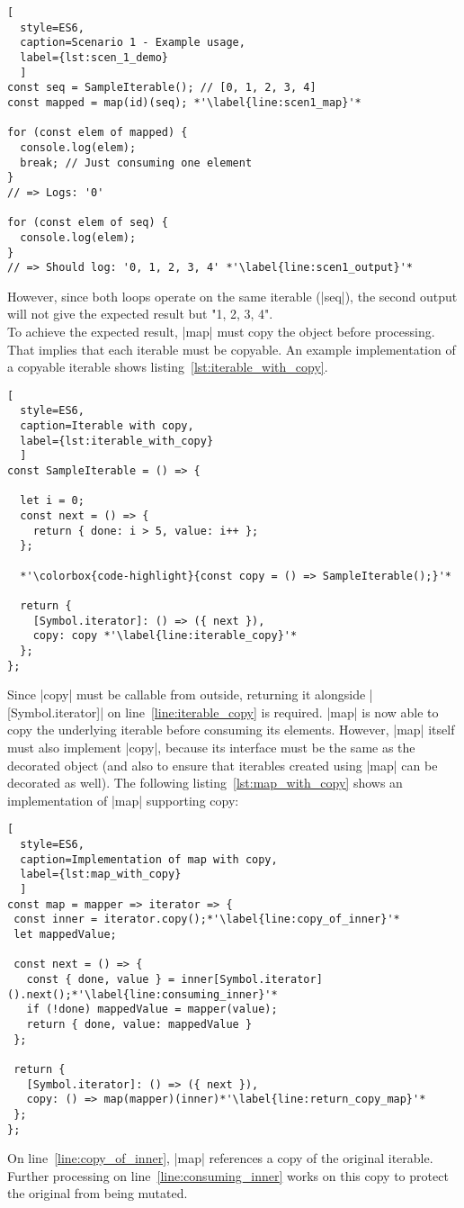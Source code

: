 \begin{lstlisting}[
  style=ES6, 
  caption=Scenario 1 - Example usage,
  label={lst:scen_1_demo}
  ]
const seq = SampleIterable(); // [0, 1, 2, 3, 4]
const mapped = map(id)(seq); *'\label{line:scen1_map}'*

for (const elem of mapped) {
  console.log(elem);
  break; // Just consuming one element
}
// => Logs: '0'

for (const elem of seq) {
  console.log(elem);
}
// => Should log: '0, 1, 2, 3, 4' *'\label{line:scen1_output}'*
\end{lstlisting}
However, since both loops operate on the same iterable (|seq|), the second output
will not give the expected result but "1, 2, 3, 4".\\
To achieve the expected result, |map| must copy the object before processing.
That implies that each iterable must be copyable. An example implementation
of a copyable iterable shows listing~\ref{lst:iterable_with_copy}.

\begin{lstlisting}[
  style=ES6, 
  caption=Iterable with copy,
  label={lst:iterable_with_copy}
  ]
const SampleIterable = () => {

  let i = 0;
  const next = () => {
    return { done: i > 5, value: i++ };
  };

  *'\colorbox{code-highlight}{const copy = () => SampleIterable();}'*

  return {
    [Symbol.iterator]: () => ({ next }),
    copy: copy *'\label{line:iterable_copy}'*
  };
};
\end{lstlisting}
Since |copy| must be callable from outside, returning it alongside 
|[Symbol.iterator]| on line~\ref{line:iterable_copy} is required. |map| is now
able to copy the underlying  iterable before consuming its elements.
However, |map| itself must also implement |copy|, because its interface must be
the same as the decorated object (and also to ensure that iterables created
using |map| can be decorated as well). The following listing~\ref{lst:map_with_copy} 
shows an implementation of |map| supporting copy:

\begin{lstlisting}[
  style=ES6, 
  caption=Implementation of map with copy,
  label={lst:map_with_copy}
  ]
const map = mapper => iterator => {
 const inner = iterator.copy();*'\label{line:copy_of_inner}'*
 let mappedValue;

 const next = () => {
   const { done, value } = inner[Symbol.iterator]().next();*'\label{line:consuming_inner}'*
   if (!done) mappedValue = mapper(value);
   return { done, value: mappedValue }
 };

 return {
   [Symbol.iterator]: () => ({ next }),
   copy: () => map(mapper)(inner)*'\label{line:return_copy_map}'*
 };
};
\end{lstlisting}
On line~\ref{line:copy_of_inner}, |map| references a copy of the original
iterable. Further processing on line~\ref{line:consuming_inner} works on this 
copy to protect the original from being mutated.

